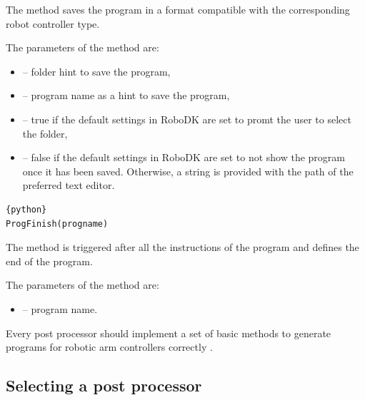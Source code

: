 The  method saves the program in a format compatible with the corresponding robot controller type. 

The parameters of the  method are:

\begin{itemize}

\item {} -- folder hint to save the program,

\item {} -- program name as a hint to save the program,

\item {} -- true if the default settings in RoboDK are set to promt the user to select the folder, 

\item {} -- false if the default settings in RoboDK are set to not show the program once it has been saved. Otherwise, a string is provided with the path of the preferred text editor.

\end{itemize}

\begin{lstlisting}[frame=lines,numbers=none,breaklines=true]{python}
ProgFinish(progname)
\end{lstlisting}
The  method is triggered after all the instructions of the program and defines the end of the program.


The parameters of the  method are:

\begin{itemize}

\item {} -- program name.

\end{itemize}


 Every post processor should implement a set of basic methods to generate programs for robotic arm controllers correctly \cite{postmethods}.


\subsection{Selecting a post processor}

